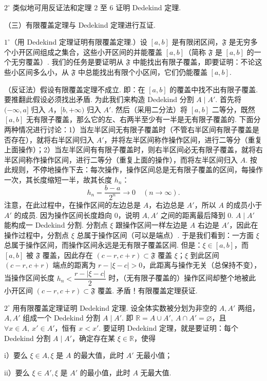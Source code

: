 \documentclass[UTF8,12pt,a4paper,fontset=fandol]{ctexart}
\begin{document}
$2^\circ$ 类似地可用反证法和定理 2 至 6 证明 Dedekind 定理.

（三）有限覆盖定理与 Dedekind 定理进行互证.

$1^\circ$（用 Dedekind 定理证明有限覆盖定理.）设 $[a,b]$ 是有限闭区间，$\mathfrak{F}$ 是无穷多个小开区间组成之集合，这些小开区间的并能覆盖 $[a,b]$（简称 $\mathfrak{F}$ 是 $[a,b]$ 的一个无穷覆盖）. 我们的任务是要证明从 $\mathfrak{F}$ 中能找出有限子覆盖，即要证明：不论这些小区间多么小，从 $\mathfrak{F}$ 中总能找出有限个小区间，它们仍能覆盖 $[a,b]$.

（反证法）假设有限覆盖定理不成立. 即：在 $[a,b]$ 的覆盖中找不出有限子覆盖. 要推翻此假设必须找出矛盾. 为此我们来构造 Dedekind 分割 $A\mid A'$. 首先将 $(-\infty,a]$ 归入 $A$，$[b,+\infty)$ 归入 $A'$. 然后（采用二分法）将 $[a,b]$ 二等分，既然 $[a,b]$ 无有限子覆盖，那么它的左、右两半至少有一半是无有限子覆盖的. 下面分两种情况进行讨论：1）当左半区间无有限子覆盖时（不管右半区间有限子覆盖是否存在），就将右半区间归入 $A'$，并将左半区间称作操作区间，进行二等分（重复上面操作）；2）当左半区间有有限子覆盖时，则右半区间必无有限子覆盖，就将右半区间称作操作区间，进行二等分（重复上面的操作），而将左半区间归入 $A$. 按此规则，不停地操作下去：每次操作，操作区间总是无有限子覆盖的区间，每操作一次，其长度缩短一半，故其长度 $h_n$：
\[
  h_n=\frac{b-a}{2^n}\to0\quad(n\to\infty).
\]
注意，在此过程中，在操作区间的左边总是 $A$，右边总是 $A'$，所以 $A$ 的成员小于 $A'$ 的成员. 因为操作区间长度趋向 0，说明 $A,A'$ 之间的距离最后降到 0. $A\mid A'$ 能构成一 Dedekind 分割. 分割点 $\xi$ 跟操作区间一样左边是 $A$ 右边是 $A'$，因此在操作过程中，分割点 $\xi$ 总属于操作区间（可以是端点）. 于是我们看到：一方面 $\xi$ 总属于操作区间，而操作区间永远是无有限子覆盖区间. 但是：$\xi\in[a,b]$，而 $[a,b]$ 被 $\mathfrak{F}$ 覆盖，因此存在 $(c-r,c+r)\subset\mathfrak{F}$ 覆盖 $\xi$；$\xi$ 到此区间 $(c-r,c+r)$ 端点的距离为 $r-|\xi-c|>0$，此距离与操作无关（总保持不变），当操作区间长度 $h_n<\dfrac{r-|\xi-c|}{2}$ 时，（无有限子覆盖的）操作区间却整个地被此小开区间 $(c-r,c+r)\subset\mathfrak{F}$ 覆盖. 矛盾！有限覆盖定理获证.

$2^\circ$ 用有限覆盖定理证明 Dedekind 定理. 设全体实数被分划为非空的 $A,A'$ 两组，$A,A'$ 组成一个 Dedekind 分割 $A\mid A'$. 即 $\mathbb{R}=A\cup A',\ A\cap A'=\varnothing$，且 $\forall x\in A,\ x'\in A'$，恒有 $x<x'$. 要证明 Dedekind 定理，就是要证明：每个 Dedekind 分割 $A\mid A'$，确定存在某 $\xi\in\mathbb{R}$，使得

i）要么 $\xi\in A,\xi$ 是 $A$ 的最大值，此时 $A'$ 无最小值；

ii）要么 $\xi\in A',\xi$ 是 $A'$ 的最小值，此时 $A$ 无最大值.
\end{document}
